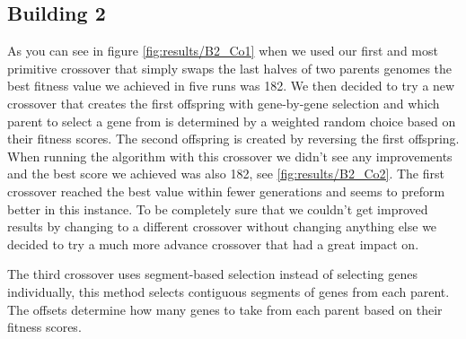 \subsection{Building 2}
As you can see in figure \ref{fig:results/B2_Co1} when we used our first and most primitive crossover that simply swaps the last halves of two parents genomes the best fitness value we achieved in five runs was 182. We then decided to try a new crossover that creates the first offspring with gene-by-gene selection and which parent to select a gene from is determined by a weighted random choice based on their fitness scores. The second offspring is created by reversing the first offspring.
When running the algorithm with this crossover we didn't see any improvements and the best score we achieved was also 182, see \ref{fig:results/B2_Co2}. The first crossover reached the best value within fewer generations and seems to preform better in this instance. To be completely sure that we couldn't get improved results by changing to a different crossover without changing anything else we decided to try a much more advance crossover that had a great impact on. %

The third crossover uses segment-based selection instead of selecting genes individually, this method selects contiguous segments of genes from each parent. The offsets determine how many genes to take from each parent based on their fitness scores.


